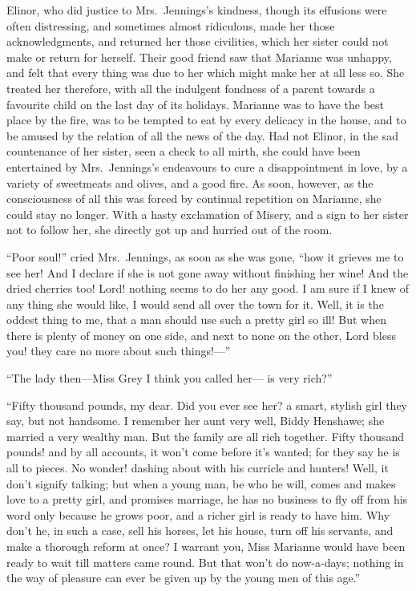 \documentclass{article}
\begin{document}
Elinor, who did justice to Mrs.\ Jennings's kindness,
though its effusions were often distressing, and sometimes
almost ridiculous, made her those acknowledgments,
and returned her those civilities, which her sister could
not make or return for herself.  Their good friend saw
that Marianne was unhappy, and felt that every thing
was due to her which might make her at all less so.
She treated her therefore, with all the indulgent fondness
of a parent towards a favourite child on the last day of
its holidays.  Marianne was to have the best place by the fire,
was to be tempted to eat by every delicacy in the house,
and to be amused by the relation of all the news of the day.
Had not Elinor, in the sad countenance of her sister,
seen a check to all mirth, she could have been entertained
by Mrs.\ Jennings's endeavours to cure a disappointment in love,
by a variety of sweetmeats and olives, and a good fire.
As soon, however, as the consciousness of all this was
forced by continual repetition on Marianne, she could
stay no longer.  With a hasty exclamation of Misery,
and a sign to her sister not to follow her, she directly got
up and hurried out of the room.

``Poor soul!'' cried Mrs.\ Jennings, as soon as she was gone,
``how it grieves me to see her!  And I declare if she is
not gone away without finishing her wine!  And the dried
cherries too!  Lord! nothing seems to do her any good.
I am sure if I knew of any thing she would like, I would
send all over the town for it.  Well, it is the oddest
thing to me, that a man should use such a pretty girl
so ill!  But when there is plenty of money on one side,
and next to none on the other, Lord bless you! they care
no more about such things!---''

``The lady then---Miss Grey I think you called her---%
is very rich?''

``Fifty thousand pounds, my dear.  Did you ever see
her? a smart, stylish girl they say, but not handsome.
I remember her aunt very well, Biddy Henshawe; she married
a very wealthy man.  But the family are all rich together.
Fifty thousand pounds! and by all accounts, it won't come
before it's wanted; for they say he is all to pieces.
No wonder! dashing about with his curricle and hunters!
Well, it don't signify talking; but when a young man,
be who he will, comes and makes love to a pretty girl,
and promises marriage, he has no business to fly off
from his word only because he grows poor, and a richer
girl is ready to have him.  Why don't he, in such a case,
sell his horses, let his house, turn off his servants,
and make a thorough reform at once? I warrant you,
Miss Marianne would have been ready to wait till matters
came round.  But that won't do now-a-days; nothing in the
way of pleasure can ever be given up by the young men of
this age.''
\end{document}
